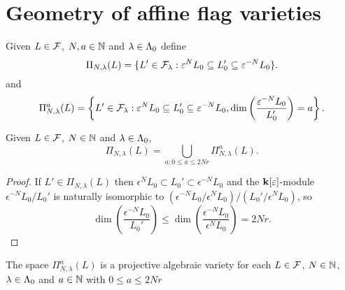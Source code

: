 \documentclass[a4paper, 11pt, twoside]{report}
\begin{document}
\section{Geometry of affine flag varieties}

Given $L\in\mathcal{F}$, $N,a\in\mathbb{N}$ and $\lambda\in\Lambda_0{}$ define
\begin{equation*}
\Pi_{N,\lambda}(L) = \{L'\in\mathcal{F}_\lambda: \varepsilon^N L_0\subseteq L_0'\subseteq \varepsilon^{-N}L_0\}.
\end{equation*}
and
\begin{equation*}
\Pi_{N,\lambda}^a(L) = \left\{L'\in\mathcal{F}_\lambda: \varepsilon^N L_0\subseteq L_0'\subseteq \varepsilon^{-N}L_0, \dim\left(\frac{\varepsilon^{-N}L_0}{L_0'}\right) = a\right\}.
\end{equation*}

\begin{lemma}
Given $L\in\mathcal{F}$, $N\in\mathbb{N}$ and $\lambda\in\Lambda_0{}$,
\begin{equation*}
\Pi_{N,\lambda}(L) = \bigcup_{a:0\le a\le 2Nr} \Pi_{N,\lambda}^a(L).
\end{equation*}
\end{lemma}

\begin{proof}
If $L'\in\Pi_{N,\lambda}(L)$ then $\epsilon^N L_0\subset L_0'\subset\epsilon^{-N} L_0$ and the $\mathbf{k}[\varepsilon]$-module $\epsilon^{-N} L_0/{L_0'}$ is naturally isomorphic to $(\epsilon^{-N}L_0/{\epsilon^N L_0})/{(L_0'/{\epsilon^N L_0})}$, so
\begin{equation*}
\dim\left(\frac{\epsilon^{-N}L_0}{L_0'}\right) \le \dim\left(\frac{\epsilon^{-N}L_0}{\epsilon^N L_0}\right) = 2Nr.
\end{equation*}
\end{proof}

\begin{lemma}\label{lemma:projective-varieties-of-cyclic-flags}
The space $\Pi_{N,\lambda}^a(L)$ is a projective algebraic variety for each $L\in\mathcal{F}$, $N\in\mathbb{N}$, $\lambda\in\Lambda_0{}$ and $a\in\mathbb{N}$ with $0\le a\le 2Nr$
\end{lemma}
\end{document}
